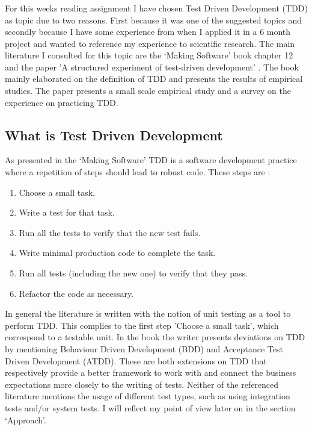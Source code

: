 \subsubsection*{}
For this weeks reading assignment I have chosen Test Driven Development (TDD) as topic due to two reasons. First because
it was one of the suggested topics and secondly because I have some experience from when I applied it in a 6 month project
and wanted to reference my experience to scientific research. The main literature I consulted for this topic are the `Making Software' \autocite{MAKING_SOFTWARE}
book chapter 12 and the paper 'A structured experiment of test-driven development' \autocite{SAC-J-2003-GeorgeW04}.
The book mainly elaborated on the definition of TDD and presents the results of empirical studies. The paper presents a
small scale empirical study and a survey on the experience on practicing TDD.

\subsection*{What is Test Driven Development}

As presented in the `Making Software' TDD is a software development practice where a repetition of steps should lead to
robust code. These steps are \autocite[208]{MAKING_SOFTWARE}:

\begin{enumerate}
  \item Choose a small task.
  \item Write a test for that task.
  \item Run all the tests to verify that the new test fails.
  \item Write minimal production code to complete the task.
  \item Run all tests (including the new one) to verify that they pass.
  \item Refactor the code as necessary.
\end{enumerate}

In general the literature is written with the notion of unit testing as a tool to perform TDD. This complies to the
first step 'Choose a small task', which correspond to a testable unit. In the book the writer presents deviations on TDD by
mentioning Behaviour Driven Development (BDD) and Acceptance Test Driven Development (ATDD). These
are both extensions on TDD that respectively provide a better framework to work with and connect the business
expectations more closely to the writing of tests. Neither of the referenced literature mentions the usage of different
test types, such as using integration tests and/or system tests. I will reflect my point of view later on in the section
`Approach'.

